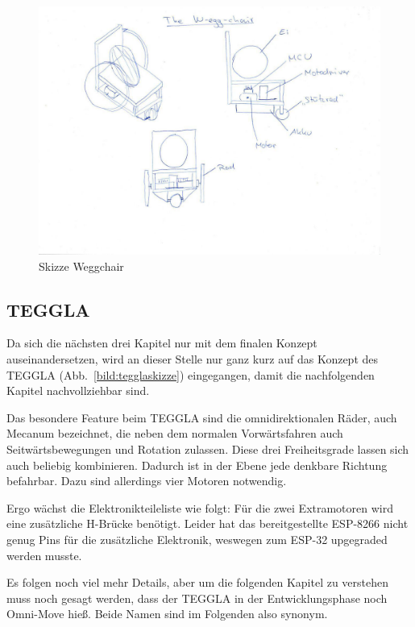 \begin{figure}[!ht]
	\centering
	\includegraphics[width=\textwidth]{bilder/weggchair.jpg}
	\caption{Skizze Weggchair}
	\label{bild:weggchair}
\end{figure}


\subsection{TEGGLA}
Da sich die nächsten drei Kapitel nur mit dem finalen Konzept auseinandersetzen, wird an dieser Stelle nur ganz kurz auf das Konzept des TEGGLA (Abb.~\ref{bild:tegglaskizze}) eingegangen, damit die nachfolgenden Kapitel nachvollziehbar sind. 

Das besondere Feature beim TEGGLA sind die omnidirektionalen Räder, auch Mecanum bezeichnet, die neben dem normalen Vorwärtsfahren auch Seitwärtsbewegungen und Rotation zulassen. 
Diese drei Freiheitsgrade lassen sich auch beliebig kombinieren. 
Dadurch ist in der Ebene jede denkbare Richtung befahrbar. Dazu sind allerdings vier Motoren notwendig. 

Ergo wächst die Elektronikteileliste wie folgt: Für die zwei Extramotoren wird eine zusätzliche H-Brücke benötigt. 
Leider hat das bereitgestellte ESP-8266 nicht genug Pins für die zusätzliche Elektronik, weswegen zum ESP-32 upgegraded werden musste. 

Es folgen noch viel mehr Details, aber um die folgenden Kapitel zu verstehen muss noch gesagt werden, dass der TEGGLA in der Entwicklungsphase noch Omni-Move hieß. Beide Namen sind im Folgenden also synonym. 


